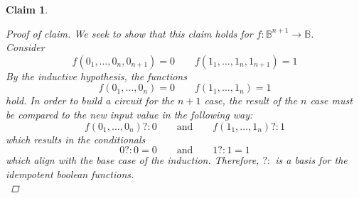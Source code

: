 \documentclass{exam} %
\newcommand{\m}[1]{\mathbb{#1}}    %
\theoremstyle{plain}
\newtheorem{claim}[thm]{Claim}      \newtheorem*{claim*}{Claim}
\theoremstyle{definition}
\theoremstyle{remark}
\newenvironment{claimproof} {
  \begin{proof}[Proof of claim]
  \renewcommand{\qedsymbol}{\ensuremath{\bullet}}
  } {
  \end{proof}
  }
\numberwithin{equation}{section}  %
\begin{document}
\begin{questions}
\begin{claim}
\begin{claimproof}
    We seek to show that this claim holds for $f:\m{B}^{n+1}\to\m{B}$.\\
    Consider\\
    \[
      f(0_1, \ldots, 0_n, 0_{n+1}) = 0 \qquad f(1_1, \ldots, 1_n, 1_{n+1}) = 1
    \]
    By the inductive hypothesis, the functions
    \[
      f(0_1, \ldots, 0_n) = 0 \qquad f(1_1, \ldots, 1_n) = 1
    \]
    hold. In order to build a circuit for the $n+1$ case, the result of the $n$ 
    case must be compared to the new input value in the following way:\\
    \[
      f(0_1,\ldots,0_n) ?: 0 \qquad\text{and}\qquad f(1_1,\ldots,1_n) ?: 1
    \]
    which results in the conditionals\\
    \[
      0 ?: 0 = 0 \qquad\text{and}\qquad 1 ?: 1 = 1
    \]
    which align with the base case of the induction. Therefore, $?:$ is a 
    basis for the idempotent boolean functions.\\
  \end{claimproof}
\end{claim}

\end{questions} 
\end{document}
